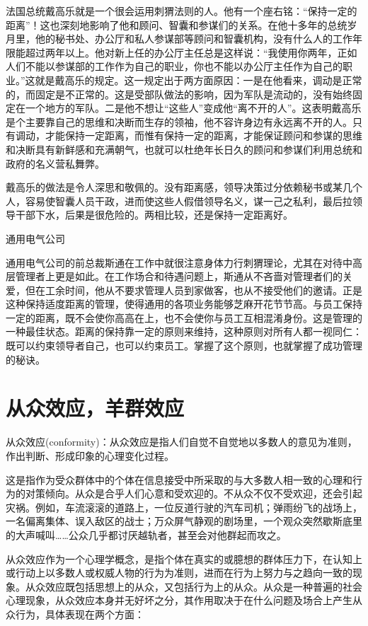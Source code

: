 \documentclass[11pt]{ctexart}
\begin{document}
法国总统戴高乐就是一个很会运用刺猬法则的人。他有一个座右铭：“保持一定的距离”！这也深刻地影响了他和顾问、智囊和参谋们的关系。在他十多年的总统岁月里，他的秘书处、办公厅和私人参谋部等顾问和智囊机构，没有什么人的工作年限能超过两年以上。他对新上任的办公厅主任总是这样说：“我使用你两年，正如人们不能以参谋部的工作作为自己的职业，你也不能以办公厅主任作为自己的职业。”这就是戴高乐的规定。这一规定出于两方面原因：一是在他看来，调动是正常的，而固定是不正常的。这是受部队做法的影响，因为军队是流动的，没有始终固定在一个地方的军队。二是他不想让“这些人”变成他“离不开的人”。这表明戴高乐是个主要靠自己的思维和决断而生存的领袖，他不容许身边有永远离不开的人。只有调动，才能保持一定距离，而惟有保持一定的距离，才能保证顾问和参谋的思维和决断具有新鲜感和充满朝气，也就可以杜绝年长日久的顾问和参谋们利用总统和政府的名义营私舞弊。

戴高乐的做法是令人深思和敬佩的。没有距离感，领导决策过分依赖秘书或某几个人，容易使智囊人员干政，进而使这些人假借领导名义，谋一己之私利，最后拉领导干部下水，后果是很危险的。两相比较，还是保持一定距离好。

通用电气公司

通用电气公司的前总裁斯通在工作中就很注意身体力行刺猬理论，尤其在对待中高层管理者上更是如此。在工作场合和待遇问题上，斯通从不吝啬对管理者们的关爱，但在工余时间，他从不要求管理人员到家做客，也从不接受他们的邀请。正是这种保持适度距离的管理，使得通用的各项业务能够芝麻开花节节高。与员工保持一定的距离，既不会使你高高在上，也不会使你与员工互相混淆身份。这是管理的一种最佳状态。距离的保持靠一定的原则来维持，这种原则对所有人都一视同仁：既可以约束领导者自己，也可以约束员工。掌握了这个原则，也就掌握了成功管理的秘诀。
\section{从众效应，羊群效应}
\label{sec-23}


从众效应(conformity)：从众效应是指人们自觉不自觉地以多数人的意见为准则，作出判断、形成印象的心理变化过程。

这是指作为受众群体中的个体在信息接受中所采取的与大多数人相一致的心理和行为的对策倾向。从众是合乎人们心意和受欢迎的。不从众不仅不受欢迎，还会引起灾祸。例如，车流滚滚的道路上，一位反道行驶的汽车司机；弹雨纷飞的战场上，一名偏离集体、误入敌区的战士；万众屏气静观的剧场里，一个观众突然歇斯底里的大声喊叫……公众几乎都讨厌越轨者，甚至会对他群起而攻之。

从众效应作为一个心理学概念，是指个体在真实的或臆想的群体压力下，在认知上或行动上以多数人或权威人物的行为为准则，进而在行为上努力与之趋向一致的现象。从众效应既包括思想上的从众，又包括行为上的从众。从众是一种普遍的社会心理现象，从众效应本身并无好坏之分，其作用取决于在什么问题及场合上产生从众行为，具体表现在两个方面：
\end{document}
